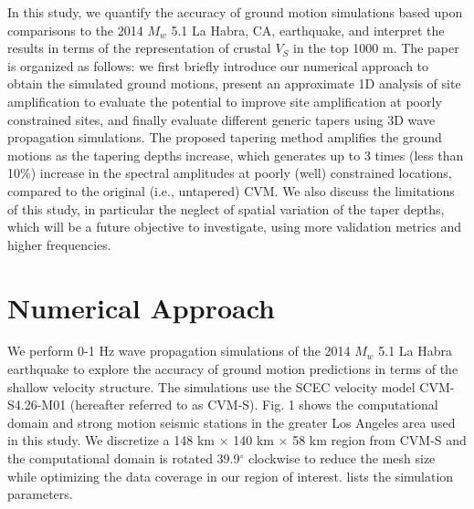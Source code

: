 In this study, we quantify the accuracy of ground motion simulations based upon comparisons to the 2014 $M_w$ 5.1 La Habra, CA, earthquake, and interpret the results in terms of the representation of crustal $V_S$ in the top 1000 m. The paper is organized as follows: we first briefly introduce our numerical approach to obtain the simulated ground motions, present an approximate 1D analysis of site amplification to evaluate the potential to improve site amplification at poorly constrained sites, and finally evaluate different generic tapers using 3D wave propagation simulations. The proposed tapering method amplifies the ground motions as the tapering depths increase, which generates up to 3 times (less than 10\%) increase in the spectral amplitudes at poorly (well) constrained locations, compared to the original (i.e., untapered) CVM. We also discuss the limitations of this study, in particular the neglect of spatial variation of the taper depths, which will be a future objective to investigate, using more validation metrics and higher frequencies.



\section{Numerical Approach}\label{vs30:approach}
We perform 0-1 Hz wave propagation simulations of the 2014 $M_w$ 5.1 La Habra earthquake to explore the accuracy of ground motion predictions in terms of the shallow velocity structure. The simulations use the SCEC velocity model CVM-S4.26-M01 (hereafter referred to as CVM-S). Fig. 1 shows the computational domain and strong motion seismic stations in the greater Los Angeles area used in this study. We discretize a 148 km $\times$ 140 km $\times$ 58 km region from CVM-S and the computational domain is rotated 39.9$^\circ$ clockwise to reduce the mesh size while optimizing the data coverage in our region of interest.  lists the simulation parameters.

